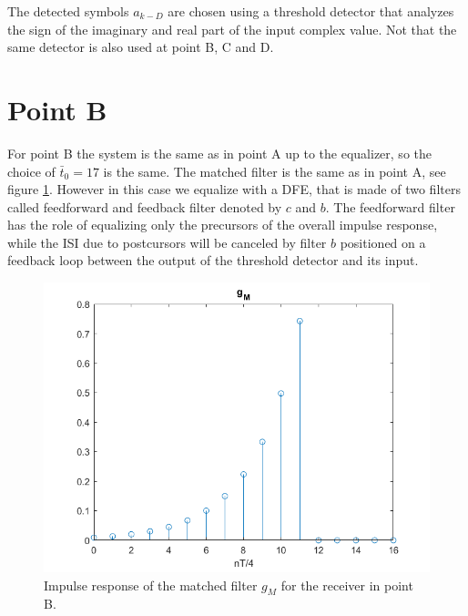 \documentclass[a4paper,11.5pt]{article}
\begin{document}
The detected symbols $a_{k-D}$ are chosen using a threshold detector that analyzes the sign of the imaginary and real part of the input complex value. Not that the same detector is also used at point B, C and D.


\section*{Point B}

For point B the system is the same as in point A up to the equalizer, so the choice of $\bar{t}_0=17$ is the same. The matched filter is the same as in point A, see figure \ref{fig:B_gm}. However in this case we equalize with a DFE, that is made of two filters called feedforward and feedback filter denoted by $c$ and $b$. The feedforward filter has the role of equalizing only the precursors of the overall impulse response, while the ISI due to postcursors will be canceled by filter $b$ positioned on a feedback loop between the output of the threshold detector and its input. 

\begin{figure}[ht]
	\begin{center}   
		\includegraphics[width=\textwidth]{figs/B_gm.png} 
		\caption{Impulse response of the matched filter $g_{M}$ for the receiver in point B.}
		\label{fig:B_gm}
	\end{center}
\end{figure}
\end{document}
